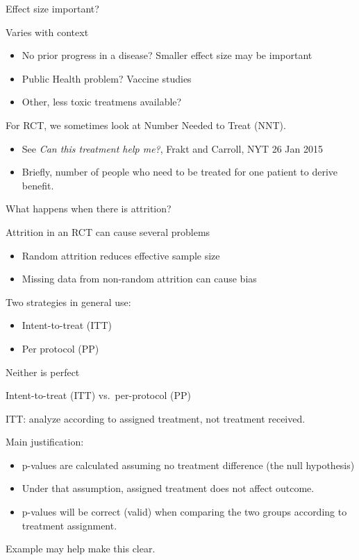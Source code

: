 \documentclass[ignorenonframetext,]{beamer}
\begin{document}
\begin{frame}{Effect size important?}

Varies with context

\begin{itemize}
\item
  No prior progress in a disease? Smaller effect size may be important
\item
  Public Health problem? Vaccine studies
\item
  Other, less toxic treatmens available?
\end{itemize}

For RCT, we sometimes look at Number Needed to Treat (NNT).

\begin{itemize}
\item
  See \textit{Can this treatment help me?}, Frakt and Carroll, NYT 26
  Jan 2015
\item
  Briefly, number of people who need to be treated for one patient to
  derive benefit.
\end{itemize}

\end{frame}

\begin{frame}{What happens when there is attrition?}

Attrition in an RCT can cause several problems

\begin{itemize}
\item
  Random attrition reduces effective sample size
\item
  Missing data from non-random attrition can cause bias
\end{itemize}

Two strategies in general use:

\begin{itemize}
\item
  Intent-to-treat (ITT)
\item
  Per protocol (PP)
\end{itemize}

Neither is perfect

\end{frame}

\begin{frame}{Intent-to-treat (ITT) vs.~per-protocol (PP)}

ITT: analyze according to assigned treatment, not treatment received.
\medskip

Main justification:

\begin{itemize}
\item
  p-values are calculated assuming no treatment difference (the null
  hypothesis)
\item
  Under that assumption, assigned treatment does not affect outcome.
\item
  p-values will be correct (valid) when comparing the two groups
  according to treatment assignment.
\end{itemize}

Example may help make this clear.

\end{frame}
\end{document}
